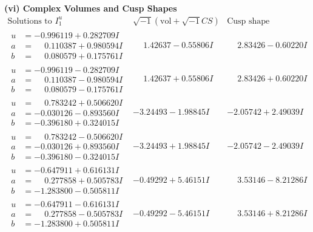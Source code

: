 \documentclass[1p]{elsarticle_modified}
\theoremstyle{definition}
\newcommand{\I}{\sqrt{-1}}
\begin{document}
\newpage\flushleft \textbf{(vi) Complex Volumes and Cusp Shapes}
$$\begin{array}{c|c|c}  
\text{Solutions to }I^u_{1}& \I (\text{vol} + \sqrt{-1}CS) & \text{Cusp shape}\\
 \hline 
\begin{aligned}
u &= -0.996119 + 0.282709 I \\
a &= \phantom{-}0.110387 + 0.980594 I \\
b &= \phantom{-}0.080579 + 0.175761 I\end{aligned}
 & \phantom{-}1.42637 - 0.55806 I & \phantom{-}2.83426 - 0.60220 I \\ \hline\begin{aligned}
u &= -0.996119 - 0.282709 I \\
a &= \phantom{-}0.110387 - 0.980594 I \\
b &= \phantom{-}0.080579 - 0.175761 I\end{aligned}
 & \phantom{-}1.42637 + 0.55806 I & \phantom{-}2.83426 + 0.60220 I \\ \hline\begin{aligned}
u &= \phantom{-}0.783242 + 0.506620 I \\
a &= -0.030126 - 0.893560 I \\
b &= -0.396180 + 0.324015 I\end{aligned}
 & -3.24493 - 1.98845 I & -2.05742 + 2.49039 I \\ \hline\begin{aligned}
u &= \phantom{-}0.783242 - 0.506620 I \\
a &= -0.030126 + 0.893560 I \\
b &= -0.396180 - 0.324015 I\end{aligned}
 & -3.24493 + 1.98845 I & -2.05742 - 2.49039 I \\ \hline\begin{aligned}
u &= -0.647911 + 0.616131 I \\
a &= \phantom{-}0.277858 + 0.505783 I \\
b &= -1.283800 - 0.505811 I\end{aligned}
 & -0.49292 + 5.46151 I & \phantom{-}3.53146 - 8.21286 I \\ \hline\begin{aligned}
u &= -0.647911 - 0.616131 I \\
a &= \phantom{-}0.277858 - 0.505783 I \\
b &= -1.283800 + 0.505811 I\end{aligned}
 & -0.49292 - 5.46151 I & \phantom{-}3.53146 + 8.21286 I \\ \hline\begin{aligned}

\end{aligned}
\end{array}$$
\end{document}
